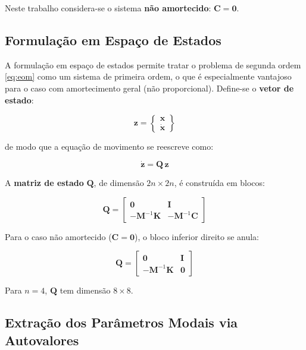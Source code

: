 \documentclass[12pt, a4paper, oneside]{article}
\numberwithin{equation}{section}
\numberwithin{figure}{section}
\numberwithin{table}{section}
\newcommand{\mat}[1]{\mathbf{#1}}
\begin{document}
Neste trabalho considera-se o sistema \textbf{não amortecido}:
$\mat{C} = \mat{0}$.

\subsection{Formulação em Espaço de Estados}

A formulação em espaço de estados permite tratar o problema de segunda ordem
\eqref{eq:eom} como um sistema de primeira ordem, o que é especialmente
vantajoso para o caso com amortecimento geral (não proporcional). Define-se o
\textbf{vetor de estado}:

\begin{equation}\label{eq:state_vec}
  \mat{z} = \begin{Bmatrix} \mat{x} \\ \dot{\mat{x}} \end{Bmatrix}
\end{equation}

de modo que a equação de movimento se reescreve como:

\begin{equation}\label{eq:state_eq}
  \dot{\mat{z}} = \mat{Q}\,\mat{z}
\end{equation}

A \textbf{matriz de estado} $\mat{Q}$, de dimensão $2n\times 2n$, é
construída em blocos:

\begin{equation}\label{eq:Q_geral}
  \mat{Q} = \begin{bmatrix}
    \mat{0}              & \mat{I}              \\
    -\mat{M}^{-1}\mat{K} & -\mat{M}^{-1}\mat{C}
  \end{bmatrix}
\end{equation}

Para o caso não amortecido ($\mat{C}=\mat{0}$), o bloco inferior direito se
anula:

\begin{equation}\label{eq:Q_undamped}
  \mat{Q} = \begin{bmatrix}
    \mat{0}              & \mat{I} \\
    -\mat{M}^{-1}\mat{K} & \mat{0}
  \end{bmatrix}
\end{equation}

Para $n=4$, $\mat{Q}$ tem dimensão $8\times 8$.

\subsection{Extração dos Parâmetros Modais via Autovalores}
\end{document}
